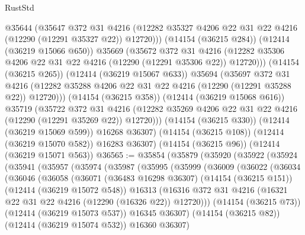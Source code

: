 \begin{lexlean}{RustStd}
\begin{coremodule}
{\begin{coremodule}
{{{{{{{{{{{{{{{{{{{{{{{{{{{{{{{{{{{{{{{{{{{{{{{{{{                @35644
                (@35647
                  @372
                  @31
                  @4216
                  (@12282 @35327 @4206 @22 @31 @22 @4216 (@12290 (@12291 @35327 @22)) @12720)))
              (@14154 (@36215 @284))
              (@12414 (@36219 @15066 @650))
              @35669
              (@35672
                @372
                @31
                @4216
                (@12282 @35306 @4206 @22 @31 @22 @4216 (@12290 (@12291 @35306 @22)) @12720)))
            (@14154 (@36215 @265))
            (@12414 (@36219 @15067 @633))
            @35694
            (@35697
              @372
              @31
              @4216
              (@12282 @35288 @4206 @22 @31 @22 @4216 (@12290 (@12291 @35288 @22)) @12720)))
          (@14154 (@36215 @358))
          (@12414 (@36219 @15068 @616))
          @35719
          (@35722
            @372
            @31
            @4216
            (@12282 @35269 @4206 @22 @31 @22 @4216 (@12290 (@12291 @35269 @22)) @12720)))
        (@14154 (@36215 @330))
        (@12414 (@36219 @15069 @599))
        @16268
        @36307)
      (@14154 (@36215 @108))
      (@12414 (@36219 @15070 @582))
      @16283
      @36307)
    (@14154 (@36215 @96))
    (@12414 (@36219 @15071 @563))
@36565 := @35854
    (@35879
      (@35920
        (@35922
          (@35924
            (@35941
              (@35957
                (@35974
                  (@35987
                    (@35995
                      (@35999
                        (@36009
                          (@36022
                            (@36034
                              (@36046
                                (@36058
                                  (@36071
                                    (@36483 @16298 @36307)
                                    (@14154 (@36215 @151))
                                    (@12414 (@36219 @15072 @548))
                                    @16313
                                    (@16316
                                      @372
                                      @31
                                      @4216
                                      (@16321 @22 @31 @22 @4216 (@12290 (@16326 @22)) @12720)))
                                  (@14154 (@36215 @73))
                                  (@12414 (@36219 @15073 @537))
                                  @16345
                                  @36307)
                                (@14154 (@36215 @82))
                                (@12414 (@36219 @15074 @532))
                                @16360
                                @36307)
}}}}}}}}}}}}}}}}}}}}}}}}}}}}}}}}}}}}}}}}}}}}}}}}}}
\end{coremodule}}
\end{coremodule}
\end{lexlean}

